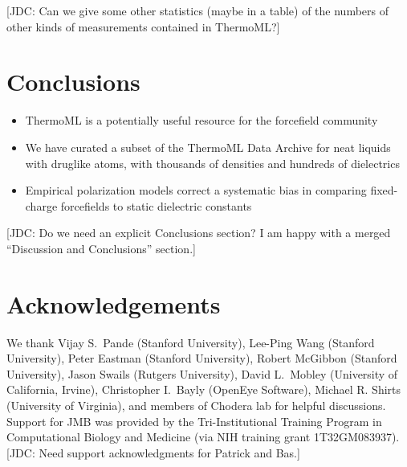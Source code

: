 \documentclass[aps,pre,twocolumn,nofootinbib,superscriptaddress,linenumbers]{revtex4-1}
\begin{document}
{\color{red}[JDC: Can we give some other statistics (maybe in a table) of the numbers of other kinds of measurements contained in ThermoML?]}


\section{Conclusions}

\begin{itemize}
\item  ThermoML is a potentially useful resource for the forcefield community
\item  We have curated a subset of the ThermoML Data Archive for neat liquids with druglike atoms, with thousands of densities and hundreds of dielectrics
\item  Empirical polarization models correct a systematic bias in comparing fixed-charge forcefields to static dielectric constants
\end{itemize}

{\color{red}[JDC: Do we need an explicit Conclusions section? I am happy with a merged ``Discussion and Conclusions'' section.]}


\section{Acknowledgements}

We thank Vijay S.~Pande (Stanford University), Lee-Ping Wang (Stanford University), Peter Eastman (Stanford University), Robert McGibbon (Stanford University), Jason Swails (Rutgers University), David L.~Mobley (University of California, Irvine), Christopher I.~Bayly (OpenEye Software), Michael R. Shirts (University of Virginia), and members of Chodera lab for helpful discussions.  
Support for JMB was provided by the Tri-Institutional Training Program in Computational Biology and Medicine (via NIH training grant 1T32GM083937).
{\color{red}[JDC: Need support acknowledgments for Patrick and Bas.]}

\end{document}
